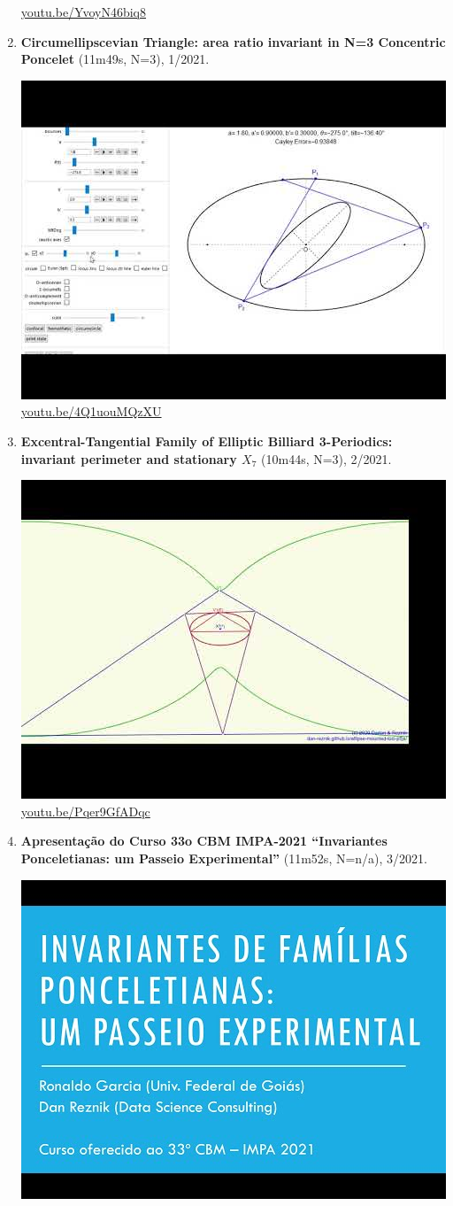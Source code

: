 \documentclass[12pt]{amsart}
\begin{document}
\begin{enumerate}[resume]
\begin{center}
\href{https://youtu.be/YvoyN46biq8}{\url{youtu.be/YvoyN46biq8}}\end{center}
% 
\item \textbf{Circumellipscevian Triangle: area ratio invariant in N=3 Concentric Poncelet} (11m49s, N=3), 1/2021. 
\begin{center}\includegraphics[width=.5\textwidth]{pics/4Q1uouMQzXU.jpg} \\ 
\href{https://youtu.be/4Q1uouMQzXU}{\url{youtu.be/4Q1uouMQzXU}}\end{center}
% 
\item \textbf{Excentral-Tangential Family of Elliptic Billiard 3-Periodics: invariant perimeter and stationary $X_{7}$} (10m44s, N=3), 2/2021. 
\begin{center}\includegraphics[width=.5\textwidth]{pics/Pqer9GfADqc.jpg} \\ 
\href{https://youtu.be/Pqer9GfADqc}{\url{youtu.be/Pqer9GfADqc}}\end{center}
% 
\item \textbf{Apresentação do Curso 33o CBM IMPA-2021
``Invariantes Ponceletianas: um Passeio Experimental''} (11m52s, N=n/a), 3/2021. 
\begin{center}\includegraphics[width=.5\textwidth]{pics/UakZhTIQVro.jpg} \\ 

\end{center}
\end{enumerate}
\end{document}
